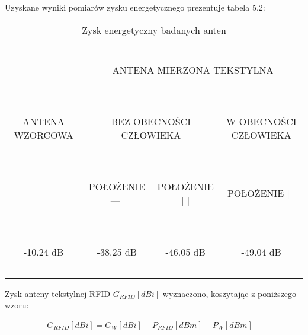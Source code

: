 \noindent
\newline Uzyskane wyniki pomiarów zysku energetycznego prezentuje tabela 5.2:


\begin{table}[h!]
\begin{center}
    \begin{tabular}{|c|c|c|c|}
    \hline
    ~               & \multicolumn{3}{c|}{~}     \\
    ~               & \multicolumn{3}{c|}{ANTENA MIERZONA TEKSTYLNA } \\
    ~               & \multicolumn{3}{c|}{~}     \\ \hline
    ~               & \multicolumn{2}{c|}{~}     & ~                                  \\
    ANTENA WZORCOWA & \multicolumn{2}{c|}{BEZ OBECNOŚCI CZŁOWIEKA} & W OBECNOŚCI CZŁOWIEKA              \\
    ~               & \multicolumn{2}{c|}{~}     & ~                                  \\ \hline
    ~               & ~                          & ~                                  & ~                                  \\
    ~               & POŁOŻENIE ----             & POŁOŻENIE [     ]                  & POŁOŻENIE [    ]                   \\
    ~               & ~                          & ~                                  & ~                                  \\ \hline
    ~               & ~                          & ~                                  & ~                                  \\
    -10.24 dB       & -38.25 dB                  & -46.05 dB                          & -49.04 dB                          \\
    ~               & ~                          & ~                                  & ~                                  \\ \hline
    \end{tabular}
    \caption{Zysk energetyczny badanych anten}
\end{center}
\end{table}


\noindent
\newline Zysk anteny tekstylnej RFID $G_{RFID}[dBi]$  wyznaczono, koszytając z poniższego wzoru:

\begin{align}
G_{RFID}[dBi] = G_{W}[dBi] + P_{RFID}[dBm] - P_W[dBm]
\quad
\end{align}


